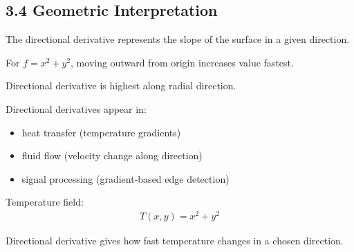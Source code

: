 \subsection*{3.4 Geometric Interpretation}

\begin{conceptbox}
    The directional derivative represents the slope of the surface in a given direction.
\end{conceptbox}

\begin{examplebox}
    For $f=x^2+y^2$, moving outward from origin increases value fastest.

    Directional derivative is highest along radial direction.
\end{examplebox}
Directional derivatives appear in:
\begin{itemize}
    \item heat transfer (temperature gradients)
    \item fluid flow (velocity change along direction)
    \item signal processing (gradient-based edge detection)
\end{itemize}

\begin{examplebox}
    Temperature field:
    \begin{align*}
        T(x,y)=x^2+y^2
    \end{align*}

    Directional derivative gives how fast temperature changes in a chosen direction.
\end{examplebox}
